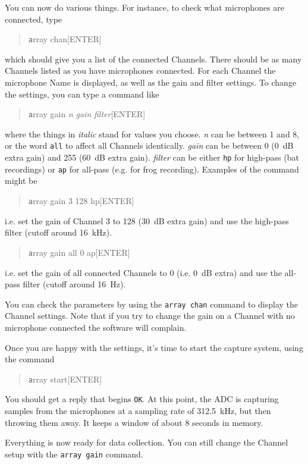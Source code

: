 \documentclass[12pt]{article}
\begin{document}
You can now do various things.  For instance, to check what
microphones are connected, type
\begin{quotation}\texttt
      array chan[ENTER]
\end{quotation}
which should give you a list of the connected Channels.  There should
be as many Channels listed as you have microphones connected.  For
each Channel the microphone Name is displayed, as well as the gain and
filter settings.  To change the settings, you can type a command like
\begin{quotation}\texttt
      array gain \textit{n} \textit{gain} \textit{filter}[ENTER]
\end{quotation}
where the things in \textit{italic} stand for values you choose.
\textit{n} can be between 1 and 8, or the word \texttt{all} to affect
all Channels identically.  \textit{gain} can be between 0 (0~dB extra
gain) and 255 (60~dB extra gain). \textit{filter} can be either
\texttt{hp} for high-pass (bat recordings) or \texttt{ap} for all-pass
(e.g. for frog recording).  Examples of the command might be
\begin{quotation}\texttt
      array gain 3 128 hp[ENTER]
\end{quotation}
i.e. set the gain of Channel 3 to 128 (30~dB extra gain) and use the
high-pass filter (cutoff around 16~kHz).
\begin{quotation}\texttt
      array gain all 0 ap[ENTER]
\end{quotation}
i.e. set the gain of all connected Channels to 0 (i.e. 0~dB extra) and
use the all-pass filter (cutoff around 16~Hz).

You can check the parameters by using the \texttt{array chan} command to
display the Channel settings.  Note that if you try to change the gain
on a Channel with no microphone connected the software will complain.

Once you are happy with the settings, it's time to start the capture
system, using the command
\begin{quotation}\texttt
      array start[ENTER]
\end{quotation}
You should get a reply that begins \texttt{OK}.  At this point, the
ADC is capturing samples from the microphones at a sampling rate of
312.5~kHz, but then throwing them away.  It keeps a window of about 8
seconds in memory.

Everything is now ready for data collection.  You can still change the
Channel setup with the \texttt{array gain} command.
\end{document}
